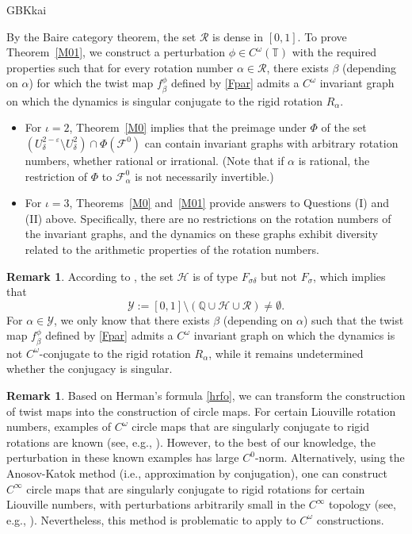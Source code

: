 \documentclass{amsart}
\theoremstyle{definition}
\newtheorem{Remark}[Definition]{Remark}
\begin{document}
\begin{CJK*}{GBK}{kai}
\vspace{1ex}

 By the Baire category theorem, the set \(\mathcal{R}\) is dense in \([0,1]\). To prove Theorem~\ref{M01}, we construct a perturbation \(\phi \in C^\omega(\mathbb{T})\) with the required properties such that for every rotation number \(\alpha \in \mathcal{R}\), there exists \(\beta\) (depending on \(\alpha\)) for which the twist map \(f_\beta^\phi\) defined by \eqref{Fpar} admits a \(C^\omega\) invariant graph on which the dynamics is singular conjugate to the rigid rotation \(R_\alpha\).



 \begin{itemize}
\item For $\iota = 2$, Theorem~\ref{M0} implies that the preimage under $\Phi$ of the set $(U_\delta^{2 - \varepsilon} \setminus U_\delta^2) \cap \Phi(\mathcal{F}^0)$ can contain invariant graphs with arbitrary rotation numbers, whether rational or irrational. (Note that if $\alpha$ is rational, the restriction of $\Phi$ to $\mathcal{F}^0_{\alpha}$ is not necessarily invertible.)

\item For $\iota = 3$, Theorems~\ref{M0} and~\ref{M01} provide answers to Questions (I) and (II) above. Specifically, there are no restrictions on the rotation numbers of the invariant graphs, and the dynamics on these graphs exhibit diversity related to the arithmetic properties of the rotation numbers.
 \end{itemize}


\begin{Remark}
According to \cite{Y3}, the set $\mathcal{H}$ is of type $F_{\sigma\delta}$ but not $F_\sigma$, which implies that
\[
\mathcal{Y} := [0,1] \setminus (\mathbb{Q} \cup \mathcal{H} \cup \mathcal{R}) \neq \emptyset.
\]
For $\alpha \in \mathcal{Y}$, we only know that there exists $\beta$ (depending on $\alpha$) such that the twist map $f_\beta^\phi$ defined by \eqref{Fpar} admits a $C^\omega$ invariant graph on which the dynamics is not $C^\omega$-conjugate to the rigid rotation $R_\alpha$, while it remains undetermined whether the conjugacy is singular.
\end{Remark}


\begin{Remark}
Based on Herman's formula \eqref{hrfo}, we can transform the construction of twist maps into the construction of circle maps. For certain Liouville rotation numbers, examples of $C^\omega$ circle maps that are singularly conjugate to rigid rotations are known (see, e.g., \cite[Theorem 12.5.1]{KH}). However, to the best of our knowledge, the perturbation in these known examples has large $C^0$-norm. Alternatively, using the Anosov-Katok method (i.e., approximation by conjugation), one can construct $C^\infty$ circle maps that are singularly conjugate to rigid rotations for certain Liouville numbers, with perturbations arbitrarily small in the $C^\infty$ topology (see, e.g., \cite[Theorem 12.6.1]{KH}). Nevertheless, this method is problematic to apply to $C^\omega$ constructions.
\end{Remark}




\end{CJK*}
\end{document}
